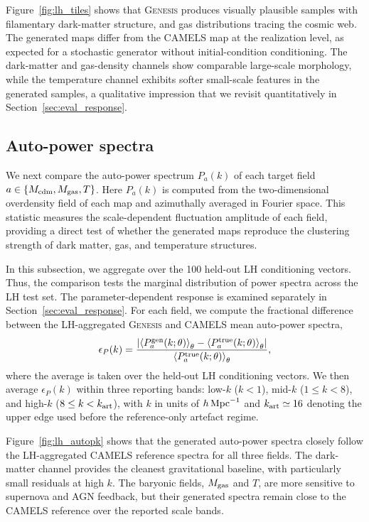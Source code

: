 \documentclass[usenatbib]{mnras}
\newcommand{\Mcdm}{M_{\rm cdm}}
\newcommand{\Mgas}{M_{\rm gas}}
\newcommand{\Tgas}{T}
\begin{document}
Figure~\ref{fig:lh_tiles} shows that \textsc{Genesis} produces
visually plausible samples with filamentary dark-matter structure,
and gas distributions tracing the cosmic web. The generated maps
differ from the CAMELS map at the realization level, as expected for
a stochastic generator without initial-condition conditioning. The
dark-matter and gas-density channels show comparable large-scale
morphology, while the temperature channel exhibits softer small-scale
features in the generated samples, a qualitative impression that we
revisit quantitatively in Section~\ref{sec:eval_response}.

\subsection{Auto-power spectra}
\label{sec:eval_autopower}

We next compare the auto-power spectrum $P_a(k)$ of each target field
$a\in\{\Mcdm,\Mgas,\Tgas\}$. Here $P_a(k)$ is computed from the
two-dimensional overdensity field of each map and azimuthally averaged
in Fourier space. This statistic measures the scale-dependent
fluctuation amplitude of each field, providing a direct test of whether
the generated maps reproduce the clustering strength of dark matter,
gas, and temperature structures.

In this subsection, we aggregate over the 100 held-out LH conditioning
vectors. Thus, the comparison tests the marginal distribution of
power spectra across the LH test set. The parameter-dependent response is examined
separately in Section~\ref{sec:eval_response}. For each field, we
compute the fractional difference between the LH-aggregated
\textsc{Genesis} and CAMELS mean auto-power spectra,
\begin{equation}
  \epsilon_P(k)
  =
  \frac{
  \left|
  \left\langle P_a^{\rm gen}(k;\theta)\right\rangle_{\theta}
  -
  \left\langle P_a^{\rm true}(k;\theta)\right\rangle_{\theta}
  \right|
  }{
  \left\langle P_a^{\rm true}(k;\theta)\right\rangle_{\theta}
  },
  \label{eq:lh_auto_eps}
\end{equation}
where the average is taken over the held-out LH conditioning vectors.
We then average $\epsilon_P(k)$ within three reporting bands:
low-$k$ ($k<1$), mid-$k$ ($1\leq k<8$), and high-$k$
($8\leq k<k_{\rm art}$), with $k$ in units of
$h\,{\rm Mpc}^{-1}$ and $k_{\rm art}\simeq 16$ denoting the upper
edge used before the reference-only artefact regime.

Figure~\ref{fig:lh_autopk} shows that the generated auto-power spectra
closely follow the LH-aggregated CAMELS reference spectra for all
three fields. The
dark-matter channel provides the cleanest gravitational baseline, with
particularly small residuals at high $k$. The baryonic fields,
$\Mgas$ and $\Tgas$, are more sensitive to supernova and AGN feedback,
but their generated spectra remain close to the CAMELS reference over
the reported scale bands.
\end{document}
